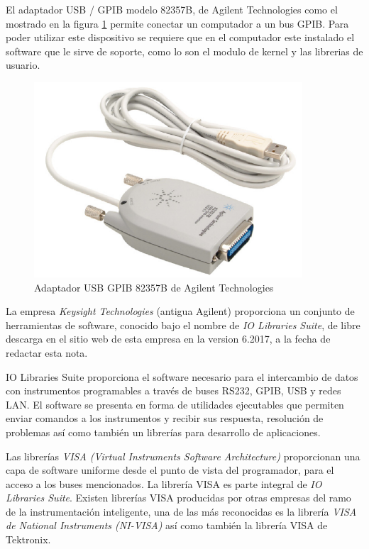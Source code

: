\documentclass[paper=letter,oneside,fontsize=11pt, parskip=full]{scrartcl}
\begin{document}
		El adaptador USB / GPIB modelo 82357B, de Agilent Technologies como el mostrado en la figura \ref{Fig:AdaptadorGpibUsb} permite conectar un computador a un bus GPIB. Para poder utilizar este dispositivo se requiere que en el computador este instalado el software que le sirve de soporte, como lo son el modulo de kernel y las librerias de usuario.	
		
		\begin{figure}[!h]
			\begin{center}
				\includegraphics[width=10cm]{Imagenes/AdaptadorGpibUsb.pdf}
				\caption{Adaptador USB GPIB 82357B de Agilent Technologies}
				\label{Fig:AdaptadorGpibUsb}
			\end{center}
		\end{figure}	
		
		La empresa \emph{Keysight Technologies} (antigua Agilent) proporciona un conjunto de herramientas de software, conocido bajo el nombre de \emph{IO Libraries Suite}, de libre descarga en el sitio web de esta empresa en la version 6.2017, a la fecha de redactar esta nota.
		
		IO Libraries Suite proporciona el software necesario para el intercambio de datos con instrumentos programables a través de buses RS232, GPIB, USB y redes LAN. El software se presenta en forma de utilidades ejecutables que permiten enviar comandos a los instrumentos y recibir sus respuesta, resolución de problemas así como también un librerías para desarrollo de aplicaciones.
		
		Las librerías \emph{VISA (Virtual Instruments Software Architecture) } proporcionan una capa de software uniforme desde el punto de vista del programador, para el acceso a los buses mencionados. La librería VISA es parte integral de \emph{IO Libraries Suite}. Existen librerías VISA producidas por otras empresas del ramo de la instrumentación inteligente, una de las más reconocidas es la librería \emph{VISA de National Instruments (NI-VISA)} así como también la librería VISA de Tektronix.
		
\end{document}
